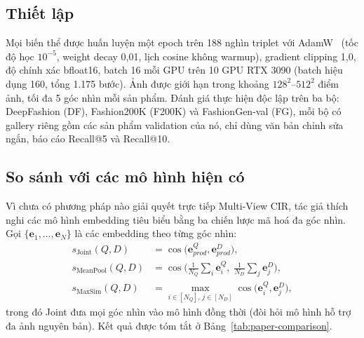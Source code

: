 \subsection{Thiết lập}

Mọi biến thể được huấn luyện một epoch trên 188 nghìn triplet với AdamW~\cite{loshchilov2019adamw} (tốc độ học $10^{-5}$, weight decay 0,01, lịch cosine không warmup), gradient clipping 1,0, độ chính xác bfloat16, batch 16 mỗi GPU trên 10 GPU RTX 3090 (batch hiệu dụng 160, tổng 1.175 bước). Ảnh được giới hạn trong khoảng $128^2$--$512^2$ điểm ảnh, tối đa 5 góc nhìn mỗi sản phẩm. Đánh giá thực hiện độc lập trên ba bộ: DeepFashion (DF), Fashion200K (F200K) và FashionGen-val (FG), mỗi bộ có gallery riêng gồm các sản phẩm validation của nó, chỉ dùng văn bản chỉnh sửa ngắn, báo cáo Recall@5 và Recall@10.

\subsection{So sánh với các mô hình hiện có}

Vì chưa có phương pháp nào giải quyết trực tiếp Multi-View CIR, tác giả thích nghi các mô hình embedding tiêu biểu bằng ba chiến lược mã hoá đa góc nhìn. Gọi $\{\mathbf{e}_1, \dots, \mathbf{e}_N\}$ là các embedding theo từng góc nhìn:
\begin{align}
    s_{\mathrm{Joint}}(Q, D) &= \cos\big(\mathbf{e}^Q_{prod}, \mathbf{e}^D_{prod}\big), \\
    s_{\mathrm{MeanPool}}(Q, D) &= \cos\Big(\tfrac{1}{N_Q}\textstyle\sum_i \mathbf{e}^Q_i,\; \tfrac{1}{N_D}\sum_j \mathbf{e}^D_j\Big), \\
    s_{\mathrm{MaxSim}}(Q, D) &= \max_{i \in [N_Q],\, j \in [N_D]} \cos\big(\mathbf{e}^Q_i, \mathbf{e}^D_j\big),
\end{align}
trong đó Joint đưa mọi góc nhìn vào mô hình đồng thời (đòi hỏi mô hình hỗ trợ đa ảnh nguyên bản). Kết quả được tóm tắt ở Bảng~\ref{tab:paper-comparison}.

